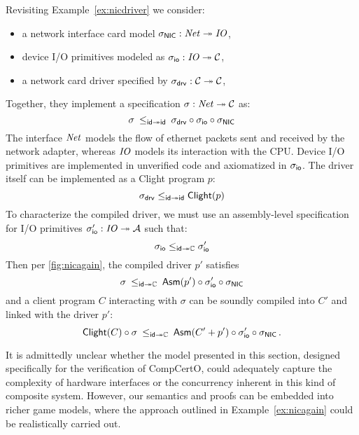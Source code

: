 \documentclass[sigplan,screen]{acmart}
\begin{document}
\begin{example} \label{ex:nicagain} %
  Revisiting Example~\ref{ex:nicdriver}
  we consider:
  \begin{itemize}
  \item a network interface card model
  $\sigma_{ \mathsf{NIC} } : \mathit{Net} \twoheadrightarrow \mathit{IO}$,
  \item device I/O primitives modeled as
  $\sigma_{ \mathsf{io} } : \mathit{IO} \twoheadrightarrow \mathcal{C}$,
  \item a network card driver specified by
  $\sigma_{ \mathsf{drv} } : \mathcal{C} \twoheadrightarrow \mathcal{C}$,
  \end{itemize}
  Together, they implement a specification
  $\sigma : \mathit{Net} \twoheadrightarrow \mathcal{C}$ as:
  \begin{equation} \label{eqn:nicspec}
    \sigma
    \: \le_{ \mathsf{id}  \twoheadrightarrow  \mathsf{id} } \:
    \sigma_{ \mathsf{drv} } \circ \sigma_{ \mathsf{io} } \circ \sigma_{ \mathsf{NIC} }
  \end{equation}
  The interface $\mathit{Net}$ models the flow of ethernet packets
  sent and received by the network adapter,
  whereas $\mathit{IO}$ models its interaction with the CPU.
  Device I/O primitives are implemented in unverified code
  and axiomatized in $\sigma_{ \mathsf{io} }$.
  The driver itself can be implemented as a Clight program $p$:
  \begin{equation} \label{eqn:drvcorrect}
    \sigma_{ \mathsf{drv} }
    \le_{ \mathsf{id}  \twoheadrightarrow  \mathsf{id} }
     \mathsf{Clight} (p)
  \end{equation}
  To characterize the compiled driver,
  we must use an assembly-level specification for I/O primitives
  $\sigma_{ \mathsf{io} }' : \mathit{IO} \twoheadrightarrow \mathcal{A}$
  such that:
  \begin{equation} \label{eqn:iocompat}
    \sigma_{ \mathsf{io} }
    \le_{ \mathsf{id}  \twoheadrightarrow \mathbb{C}}
    \sigma_{ \mathsf{io} }'
  \end{equation}
  Then per \autoref{fig:nicagain},
  the compiled driver $p'$ satisfies
  \[
    \sigma
    \: \le_{ \mathsf{id}  \twoheadrightarrow \mathbb{C}} \:
     \mathsf{Asm} (p') \circ \sigma_{ \mathsf{io} }' \circ \sigma_{ \mathsf{NIC} }
  \]
  and a client program $C$ interacting with $\sigma$
  can be soundly compiled into $C'$ and linked with the driver $p'$:
  \[
     \mathsf{Clight} (C) \circ \sigma
    \: \le_{ \mathsf{id}  \twoheadrightarrow \mathbb{C}} \:
     \mathsf{Asm} (C' + p') \circ \sigma_{ \mathsf{io} }' \circ \sigma_{ \mathsf{NIC} }
    \,.
  \]
\end{example}

It is admittedly unclear whether
the model presented in this section,
designed specifically for the verification of CompCertO,
could adequately capture
the complexity of hardware interfaces
or the concurrency inherent in this kind of composite system.
However,
our semantics and proofs
can be embedded into richer game models,
where the approach outlined in Example~\ref{ex:nicagain}
could be realistically carried out.
\end{document}
